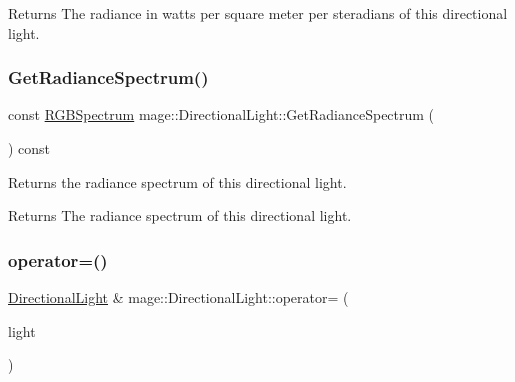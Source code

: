 \begin{DoxyReturn}{Returns}
The radiance in watts per square meter per steradians of this directional light. 
\end{DoxyReturn}
\hypertarget{classmage_1_1_directional_light_ac2f562fc0c5f3ff75001dfac3ff06f1c}{}\label{classmage_1_1_directional_light_ac2f562fc0c5f3ff75001dfac3ff06f1c} 
\subsubsection{\texorpdfstring{Get\+Radiance\+Spectrum()}{GetRadianceSpectrum()}}
{\footnotesize\ttfamily const \hyperlink{structmage_1_1_r_g_b_spectrum}{R\+G\+B\+Spectrum} mage\+::\+Directional\+Light\+::\+Get\+Radiance\+Spectrum (\begin{DoxyParamCaption}{ }\end{DoxyParamCaption}) const\hspace{0.3cm}{\ttfamily [noexcept]}}

Returns the radiance spectrum of this directional light.

\begin{DoxyReturn}{Returns}
The radiance spectrum of this directional light. 
\end{DoxyReturn}
\hypertarget{classmage_1_1_directional_light_a371d3c13d6e59c8d105da058b460874d}{}\label{classmage_1_1_directional_light_a371d3c13d6e59c8d105da058b460874d} 
\subsubsection{\texorpdfstring{operator=()}{operator=()}\hspace{0.1cm}{\footnotesize\ttfamily [1/2]}}
{\footnotesize\ttfamily \hyperlink{classmage_1_1_directional_light}{Directional\+Light} \& mage\+::\+Directional\+Light\+::operator= (\begin{DoxyParamCaption}\item[{const \hyperlink{classmage_1_1_directional_light}{Directional\+Light} \&}]{light }\end{DoxyParamCaption})\hspace{0.3cm}{\ttfamily [default]}}

